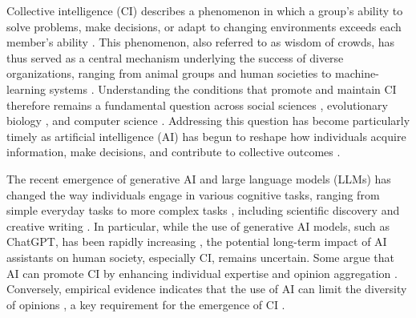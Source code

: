 \documentclass[12pt]{article}
\begin{document}
Collective intelligence (CI) describes a phenomenon in which a group’s ability to solve problems, make decisions, or adapt to changing environments exceeds each member’s ability \citep{galton1907vox,woolley2010evidence,yaniv2007using,hommes2005coordination,lorge1958survey}.
This phenomenon, also referred to as wisdom of crowds, has thus served as a central mechanism underlying the success of diverse organizations, ranging from animal groups \citep{dreyer2025comparing,simons2004many,berdahl2013emergent} and human societies \citep{woolley2010evidence, riedl2021quantifying} to machine-learning systems \citep{breiman1996bagging,breiman2001random}.
Understanding the conditions that promote and maintain CI therefore remains a fundamental question across social sciences \citep{mann2017optimal}, evolutionary biology \citep{wang2025individual}, and computer science \citep{werfel2026fluid}.
Addressing this question has become particularly timely as artificial intelligence (AI) has begun to reshape how individuals acquire information, make decisions, and contribute to collective outcomes \citep{cui2024ai}.

The recent emergence of generative AI and large language models (LLMs) has changed the way individuals engage in various cognitive tasks, ranging from simple everyday tasks to more complex tasks \citep{noy2023experimental,brynjolfsson2025generative}, including scientific discovery \citep{lu2026towards} and creative writing \citep{doshi2024generative}.
In particular, while the use of generative AI models, such as ChatGPT, has been rapidly increasing \citep{bick2026rapid,sajadieh2026artificial}, the potential long-term impact of AI assistants on human society, especially CI, remains uncertain.
Some argue that AI can promote CI by enhancing individual expertise \citep{vaccaro2024combinations} and opinion aggregation \citep{burton2024large,tessler2024ai}.
Conversely, empirical evidence indicates that the use of AI can limit the diversity of opinions \citep{ fugener2021will,doshi2024generative,lee2024empirical,meincke2025chatgpt}, a key requirement for the emergence of CI \citep{hong2004groups,lorenz2011social,aplin2014individual,becker2017network}.
\end{document}
